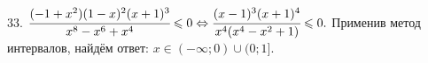 33. $\cfrac{(-1+x^2)(1-x)^2(x+1)^3}{x^8-x^6+x^4}\leqslant0\Leftrightarrow\cfrac{(x-1)^3(x+1)^4}{x^4(x^4-x^2+1)}\leqslant0.$ Применив метод интервалов, найдём ответ: $x\in(-\infty;0)\cup(0;1].$
\begin{figure}[ht!]
\end{figure}\\
